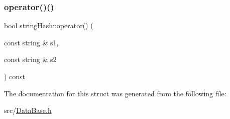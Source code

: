 \mbox{\label{structstringHash_af490d7bfd9ca18975134236254427481}} 
\subsubsection{\texorpdfstring{operator()()}{operator()()}\hspace{0.1cm}{\footnotesize\ttfamily [2/2]}}
{\footnotesize\ttfamily bool string\+Hash\+::operator() (\begin{DoxyParamCaption}\item[{const string \&}]{s1,  }\item[{const string \&}]{s2 }\end{DoxyParamCaption}) const\hspace{0.3cm}{\ttfamily [inline]}}



The documentation for this struct was generated from the following file\+:\begin{DoxyCompactItemize}
\item 
src/\hyperlink{DataBase_8h}{Data\+Base.\+h}\end{DoxyCompactItemize}
